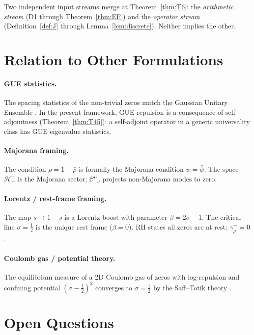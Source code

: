 \documentclass[12pt,a4paper]{article}
\theoremstyle{remark}
\begin{document}
Two independent input streams merge at Theorem~\ref{thm:T6}:
the \emph{arithmetic stream} (D1 through Theorem~\ref{thm:EF})
and the \emph{operator stream} (Definition~\ref{def:J} through
Lemma~\ref{lem:discrete}).
Neither implies the other.

\section{Relation to Other Formulations}
\label{app:approaches}

\paragraph{GUE statistics.}
The spacing statistics of the non-trivial zeros match the Gaussian Unitary
Ensemble \cite{Montgomery1973,Odlyzko1987}.
In the present framework, GUE repulsion is a consequence of self-adjointness
(Theorem~\ref{thm:T45}): a self-adjoint operator in a generic universality
class has GUE eigenvalue statistics.

\paragraph{Majorana framing.}
The condition $\rho=1-\bar\rho$ is formally the Majorana condition
$\psi=\bar\psi$. The space $\mathcal{H}^+_+$ is the Majorana sector;
$\mathcal{C}^{\mu}{}_\nu$ projects non-Majorana modes to zero.

\paragraph{Lorentz / rest-frame framing.}
The map $s\mapsto1-s$ is a Lorentz boost with parameter $\beta=2\sigma-1$.
The critical line $\sigma=\tfrac{1}{2}$ is the unique rest frame ($\beta=0$).
RH states all zeros are at rest: $\gamma_\rho^-=0$.

\paragraph{Coulomb gas / potential theory.}
The equilibrium measure of a 2D Coulomb gas of zeros with log-repulsion
and confining potential $(\sigma-\tfrac{1}{2})^2$ converges to
$\sigma=\tfrac{1}{2}$ by the Saff--Totik theory \cite{SaffTotik1997}.

\section{Open Questions}
\label{app:open}
\end{document}

